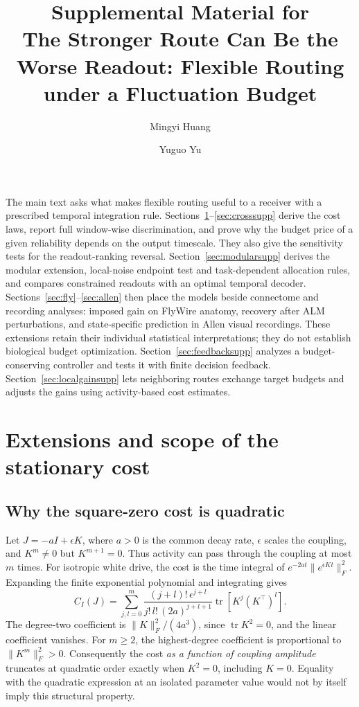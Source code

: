 \documentclass[aps,10pt,onecolumn,superscriptaddress,nofootinbib,
  longbibliography,amsmath,amssymb,floatfix]{revtex4-2}
\newcommand{\Tr}{\operatorname{tr}}
\begin{document}
\title{Supplemental Material for\texorpdfstring{\\}{: }
The Stronger Route Can Be the Worse Readout: Flexible Routing under a Fluctuation Budget}
\author{Mingyi Huang}
\noaffiliation
\author{Yuguo Yu}
\noaffiliation
\maketitle

The main text asks what makes flexible routing useful to a receiver
with a prescribed temporal integration rule. Sections~\ref{sec:cost}--\ref{sec:crosssupp}
derive the cost laws, report full window-wise discrimination,
and prove why the budget price of a given reliability depends
on the output timescale. They also give the sensitivity tests
for the readout-ranking reversal. Section~\ref{sec:modularsupp}
derives the modular extension, local-noise endpoint test and
task-dependent allocation rules, and compares constrained readouts
with an optimal temporal decoder. Sections~\ref{sec:fly}--\ref{sec:allen}
then place the models beside connectome and recording analyses:
imposed gain on FlyWire anatomy, recovery after ALM perturbations,
and state-specific prediction in Allen visual recordings. These
extensions retain their individual statistical interpretations;
they do not establish biological budget optimization.
Section~\ref{sec:feedbacksupp} analyzes a budget-conserving
controller and tests it with finite decision feedback.
Section~\ref{sec:localgainsupp} lets neighboring routes exchange
target budgets and adjusts the gains using activity-based cost estimates.

\section{Extensions and scope of the stationary cost}
\label{sec:cost}

\subsection{Why the square-zero cost is quadratic}

Let \(J=-aI+\epsilon K\), where \(a>0\) is the common decay rate,
\(\epsilon\) scales the coupling, and \(K^m\ne0\) but \(K^{m+1}=0\).
Thus activity can pass through the coupling at most \(m\) times.
For isotropic white drive, the cost is the time integral of
\(e^{-2at}\|e^{\epsilon Kt}\|_F^2\). Expanding the finite exponential
polynomial and integrating gives
\begin{equation}
 C_I(J)=
 \sum_{j,l=0}^m
 \frac{(j+l)!\,\epsilon^{j+l}}{j!\,l!\,(2a)^{j+l+1}}
 \Tr\!\left[K^j(K^\top)^l\right].
 \label{eq:nilpotent}
\end{equation}
The degree-two coefficient is \(\|K\|_F^2/(4a^3)\), since
\(\Tr K^2=0\), and the linear coefficient vanishes. For \(m\ge2\), the
highest-degree coefficient is proportional to \(\|K^m\|_F^2>0\).
Consequently the cost \emph{as a function of coupling amplitude}
truncates at quadratic order exactly when \(K^2=0\), including \(K=0\).
Equality with the quadratic expression at an isolated parameter value
would not by itself imply this structural property.
\end{document}
